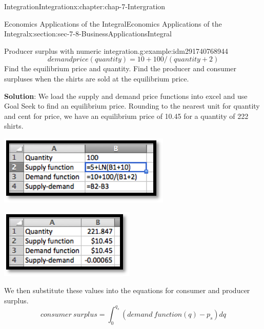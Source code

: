 \documentclass[oneside,10pt,]{book}
\newcommand{\terminology}[1]{\textbf{#1}}
\numberwithin{equation}{section}
\begin{document}
\begin{chapterptx}{Integration}{}{Integration}{}{}{x:chapter:chap-7-Intergration}
\begin{sectionptx}{Economics Applications of the Integral}{}{Economics Applications of the Integral}{}{}{x:section:sec-7-8-BusinessApplicationsIntegral}
\begin{example}{Producer surplus with numeric integration.}{g:example:idm291740768944}
\begin{equation*}
demand price(quantity)=10+100/(quantity+2)
\end{equation*}
Find the equilibrium price and quantity.  Find the producer and consumer surpluses when the shirts are sold at the equilibrium price.%
\par
\terminology{Solution}: We load the supply and demand price functions into excel and use Goal Seek to find an equilibrium price.  Rounding to the nearest unit for quantity and cent for price, we have an equilibrium price of \textdollar{}10.45 for a quantity of 222 shirts.%
\begin{sidebyside}{1}{0.3}{0.3}{0}%
\begin{sbspanel}{0.4}%
\includegraphics[width=\linewidth]{images/sec7-8-4.png}
\end{sbspanel}%
\end{sidebyside}%
\begin{sidebyside}{1}{0.3}{0.3}{0}%
\begin{sbspanel}{0.4}%
\includegraphics[width=\linewidth]{images/sec7-8-5.png}
\end{sbspanel}%
\end{sidebyside}%
\par
We then substitute these values into the equations for consumer and producer surplus.%
%
\begin{equation*}
consumer\ surplus= \int_0^{q_s} (demand\ function(q)- p_s )  dq

\end{equation*}
\end{example}
\end{sectionptx}
\end{chapterptx}
\end{document}
